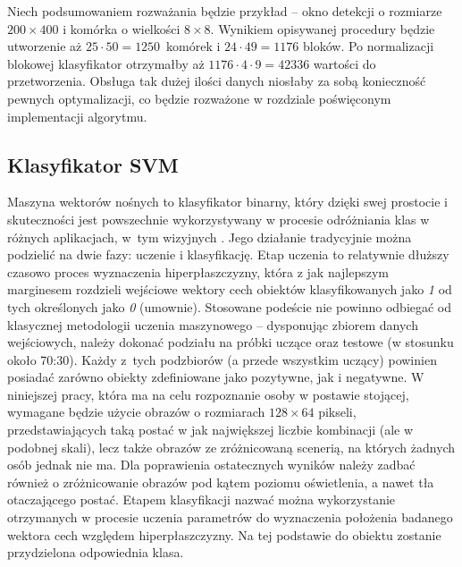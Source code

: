 Niech podsumowaniem rozważania będzie przykład -- okno detekcji o rozmiarze \mbox{$200\times 400$} i komórka o wielkości $8 \times 8$. 
Wynikiem opisywanej procedury będzie utworzenie aż \mbox{$25\cdot50=1250$}~komórek i $24\cdot 49=1176$ bloków. 
Po normalizacji blokowej klasyfikator otrzymałby aż $1176\cdot4\cdot9=42336$ wartości do przetworzenia. 
Obsługa tak dużej ilości danych niosłaby za sobą konieczność pewnych optymalizacji, co będzie rozważone w rozdziale poświęconym implementacji algorytmu.

\subsection{Klasyfikator SVM}

Maszyna wektorów nośnych to klasyfikator binarny, który dzięki swej prostocie i skuteczności jest powszechnie wykorzystywany w procesie odróżniania klas w różnych aplikacjach, w~tym wizyjnych \cite{Gunn}. 
Jego działanie tradycyjnie można podzielić na dwie fazy: uczenie i klasyfikację. 
Etap uczenia to relatywnie dłuższy czasowo proces wyznaczenia hiperpłaszczyzny, która z jak najlepszym marginesem rozdzieli wejściowe wektory cech obiektów klasyfikowanych jako \textit{1} od tych określonych jako \textit{0} (umownie). 
Stosowane podeście nie powinno odbiegać od klasycznej metodologii uczenia maszynowego -- dysponując zbiorem danych wejściowych, należy dokonać podziału na próbki uczące oraz testowe (w stosunku około 70:30).
Każdy z~tych podzbiorów (a przede wszystkim uczący) powinien posiadać zarówno obiekty zdefiniowane jako pozytywne, jak i negatywne. 
W niniejszej pracy, która ma na celu rozpoznanie osoby w postawie stojącej, wymagane będzie użycie obrazów o rozmiarach $128 \times 64$ pikseli, przedstawiających taką postać w jak największej liczbie kombinacji (ale w podobnej skali), lecz także obrazów ze zróżnicowaną scenerią, na których żadnych osób jednak nie ma. 
Dla poprawienia ostatecznych wyników należy zadbać również o zróżnicowanie obrazów pod kątem poziomu oświetlenia, a nawet tła otaczającego postać.
Etapem klasyfikacji nazwać można wykorzystanie otrzymanych w procesie uczenia parametrów do wyznaczenia położenia badanego wektora cech względem hiperpłaszczyzny. 
Na tej podstawie do obiektu zostanie przydzielona odpowiednia klasa.

